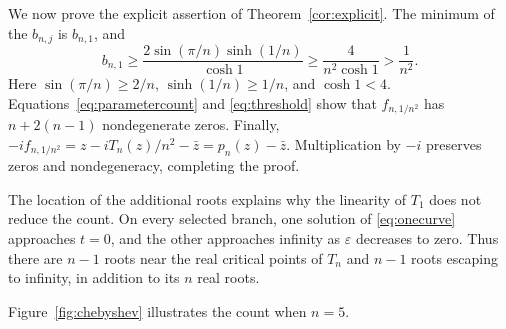 \documentclass[a4paper]{amsart}
\theoremstyle{remark}
\newcommand{\eps}{\varepsilon}
\begin{document}
We now prove the explicit assertion of Theorem~\ref{cor:explicit}.
The minimum of the \(b_{n,j}\) is \(b_{n,1}\), and
\begin{equation}\label{eq:threshold}
 b_{n,1}\ge
 \frac{2\sin(\pi/n)\sinh(1/n)}{\cosh1}
 \ge \frac{4}{n^2\cosh1}>\frac1{n^2}.
\end{equation}
Here \(\sin(\pi/n)\ge2/n\), \(\sinh(1/n)\ge1/n\), and
\(\cosh1<4\). Equations~\eqref{eq:parametercount} and
\eqref{eq:threshold} show that \(f_{n,1/n^2}\) has \(n+2(n-1)\)
nondegenerate zeros. Finally,
\(-if_{n,1/n^2}=z-iT_n(z)/n^2-\bar z=p_n(z)-\bar z\).
Multiplication by \(-i\) preserves zeros and nondegeneracy, completing
the proof.

The location of the additional roots explains why the linearity
of \(T_1\) does not reduce the count. On every selected branch,
one solution of \eqref{eq:onecurve} approaches \(t=0\), and the
other approaches infinity as \(\eps\) decreases to zero.
Thus there are \(n-1\) roots near the real critical points of \(T_n\)
and \(n-1\) roots escaping to infinity, in addition to its \(n\)
real roots.

Figure~\ref{fig:chebyshev} illustrates the count when \(n=5\).
\end{document}
